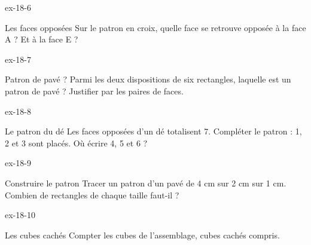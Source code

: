 \begin{blocLivre}{ex-18-6}\begin{exercice}[2]{Les faces opposées}
Sur le patron en croix, quelle face se retrouve opposée à la face A ? Et à la face E ?
\label{fig-ex-18-6}
\end{exercice}\end{blocLivre}
\begin{blocLivre}{ex-18-7}\begin{exercice}[2]{Patron de pavé ?}
Parmi les deux dispositions de six rectangles, laquelle est un patron de pavé ? Justifier par les paires de faces.
\label{fig-ex-18-7}
\end{exercice}\end{blocLivre}
\begin{blocLivre}{ex-18-8}\begin{exercice}[2]{Le patron du dé}
Les faces opposées d’un dé totalisent 7. Compléter le patron : 1, 2 et 3 sont placés. Où écrire 4, 5 et 6 ?
\label{fig-ex-18-8}
\end{exercice}\end{blocLivre}
\begin{blocLivre}{ex-18-9}\begin{exercice}[2]{Construire le patron}
Tracer un patron d’un pavé de 4 cm sur 2 cm sur 1 cm. Combien de rectangles de chaque taille faut-il ?
\label{fig-ex-18-9}
\end{exercice}\end{blocLivre}
\begin{blocLivre}{ex-18-10}\begin{exercice}[2]{Les cubes cachés}
Compter les cubes de l’assemblage, cubes cachés compris.
\label{fig-ex-18-10}
\end{exercice}\end{blocLivre}

